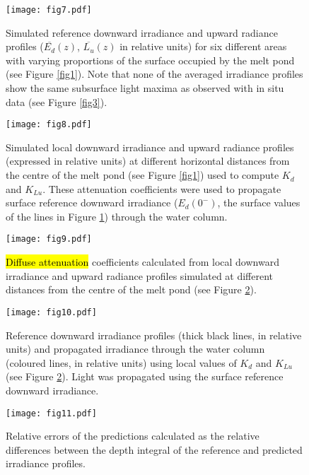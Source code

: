 \documentclass[applsci,article,accept,moreauthors,pdftex,10pt,a4paper]{Definitions/mdpi}
\newcommand{\ked}{\ensuremath{K_{d}}}
\newcommand{\klu}{\ensuremath{K_{Lu}}}
\newcommand{\edzero}{\ensuremath{{E_d(0^-)}}}
\newcommand{\meanedz}{\ensuremath{{\overline{E_d}(z)}}}
\newcommand{\meanluz}{\ensuremath{{\overline{L_u}(z)}}}
\begin{document}
\begin{figure}[H]
	\centering
	\texttt{[image: fig7.pdf]}
	\caption{Simulated reference downward irradiance and upward radiance profiles (\meanedz{}, \meanluz{} in relative units) for six different areas with varying proportions of the surface occupied by the melt pond (see Figure \ref{fig1}). Note that none of the averaged irradiance profiles show the same subsurface light maxima as observed with in situ data (see Figure \ref{fig3}).}\label{fig7}
\end{figure}



\begin{figure}[H]
	\centering
	\texttt{[image: fig8.pdf]}
	\caption{Simulated local downward irradiance and upward radiance profiles (expressed in relative units) at different horizontal distances from the centre of the melt pond (see Figure \ref{fig1}) used to compute \ked{} and \klu{}. These attenuation coefficients were used to propagate surface reference downward irradiance (\edzero{}, the surface values of the lines in Figure \ref{fig7}) through the water column.}\label{fig8}
\end{figure}



\begin{figure}[H]
	\centering
	\texttt{[image: fig9.pdf]}
	\caption{\hl{Diffuse attenuation} %
	coefficients calculated from local downward irradiance and upward radiance profiles simulated at different distances from the centre of the melt pond (see Figure \ref{fig8}).}\label{fig9}
\end{figure}


\begin{figure}[H]
	\centering
	\texttt{[image: fig10.pdf]}
	\caption{Reference downward irradiance profiles (thick black lines, in relative units) and propagated irradiance through the water column (coloured lines, in relative units) using local values of \ked{} and \klu{} (see Figure \ref{fig8}). Light was propagated using the surface reference downward irradiance.}\label{fig10}
\end{figure}

\begin{figure}[H]
	\centering
	\texttt{[image: fig11.pdf]}
	\caption{Relative errors of the predictions calculated as the relative differences between the depth integral of the reference and predicted irradiance profiles.}\label{fig11}
\end{figure}
\end{document}
